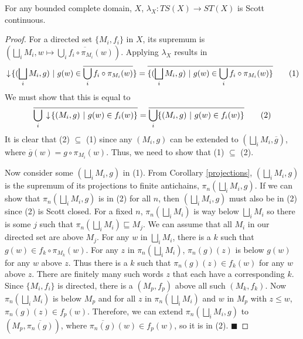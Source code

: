 \begin{proposition}
For any bounded complete domain, $X$, $\lambda_X:TS(X)\to ST(X)$ is Scott continuous.
\end{proposition}
\begin{proof}
For a directed set $\{M_i,f_i\}$ in $X$, its supremum is $(\bigsqcup_i M_i, w\mapsto\overline{\bigcup_i f_i\circ \pi_{M_i}(w)})$.  Applying $\lambda_X$ results in 
\[\da\{(\bigsqcup_i M_i,g)\ |\ g(w) \in \overline{\bigcup_i f_i\circ \pi_{M_i} (w)}\} = \overline{\{(\bigsqcup_i M_i,g)\ |\ g(w) \in \bigcup_i f_i\circ \pi_{M_i} (w)\}}\tag{1}\]   
We must show that this is equal to
\[\overline{\bigcup_i \da\{(M_i,g)\ |\ g(w)\in f_i(w)\}} = \overline{\bigcup_i\{(M_i,g)\ |\ g(w)\in f_i(w)\}}\tag{2}\]
It is clear that (2) $\subseteq$ (1) since any $(M_i, g)$ can be extended to $(\bigsqcup_i M_i, \overline{g})$, where $\overline{g}(w) = g\circ \pi_{M_i}(w)$.  Thus, we need to show that (1) $\subseteq$ (2).  


Now consider some $(\bigsqcup_i M_i, g)$ in (1).  From Corollary \ref{projections}, $(\bigsqcup_i M_i, g)$ is the supremum of its projections to finite antichains, $\pi_n(\bigsqcup_i M_i, g)$.  If we can show that $\pi_n(\bigsqcup_i M_i, g)$ is in (2) for all $n$, then $(\bigsqcup_i M_i, g)$ must also be in (2) since (2) is Scott closed.  For a fixed $n$, $\pi_n(\bigsqcup_i M_i)$ is way below $\bigsqcup_i M_i$ so there is some $j$ such that $\pi_n(\bigsqcup_i M_i)\sqsubseteq M_j$.  We can assume that all $M_i$ in our directed set are above $M_j$.  For any $w$ in $\bigsqcup_i M_i$, there is a $k$ such that $g(w) \in f_k \circ \pi_{M_k}(w)$.  For any $z$ in $\pi_n(\bigsqcup_i M_i)$, $\pi_n(g)(z)$ is below $g(w)$ for any $w$ above $z$.  Thus there is a $k$ such that $\pi_n(g)(z) \in f_k(w)$ for any $w$ above $z$.  There are finitely many such words $z$ that each have a corresponding $k$.  Since $\{M_i, f_i\}$ is directed, there is a $(M_p, f_p)$ above all such $(M_k, f_k)$.  Now $\pi_n(\bigsqcup_i M_i)$ is below $M_p$ and for all $z$ in $\pi_n(\bigsqcup_i M_i)$ and $w$ in $M_p$ with $z\leq w$, $\pi_n(g)(z) \in f_p(w)$.  Therefore, we can extend $\pi_n(\bigsqcup_i M_i, g)$ to $(M_p, \overline{\pi_n(g)})$, where $\overline{\pi_n(g)}(w) \in f_p(w)$, so it is in (2).
\hfill $\blacksquare$
\end{proof}

